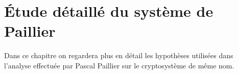 
\chapter{Étude détaillé du système de Paillier}
	\label{chap:detaille}
	Dans ce chapitre on regardera plus en détail les hypothèses utilisées dans l'analyse 
	effectuée par Pascal Paillier\cite{DBLP:conf/eurocrypt/Paillier99} sur le cryptosystème
	de mê\-me nom.
	
	
	
	
		

